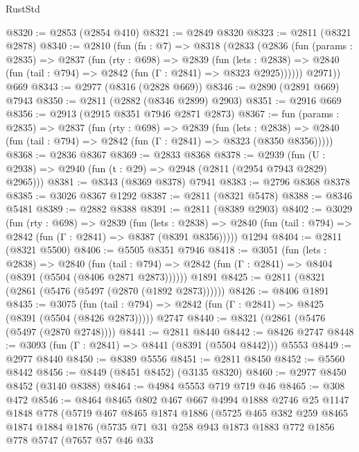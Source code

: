\begin{lexlean}{RustStd}
\begin{coremodule}
{\begin{coremodule}
{{{{{{{{{{{{{{{@8320 := @2853 (@2854 @410)
@8321 := @2849 @8320
@8323 := @2811 (@8321 @2878)
@8340 := @2810
    (fun (fn : @7) =>
    @8318
      (@2833
        (@2836
          (fun (params : @2835) =>
          @2837
            (fun (rty : @698) =>
            @2839
              (fun (lets : @2838) =>
              @2840 (fun (tail : @794) => @2842 (fun (Γ : @2841) => @8323 @2925))))))
        @2971))
    @669
@8343 := @2977 (@8316 (@2828 @669))
@8346 := @2890 (@2891 @669) @7943
@8350 := @2811 (@2882 (@8346 @2899) @2903)
@8351 := @2916 @669
@8356 := @2913 (@2915 @8351 @7946 @2871 @2873)
@8367 := fun (params : @2835) =>
  @2837
    (fun (rty : @698) =>
    @2839
      (fun (lets : @2838) =>
      @2840 (fun (tail : @794) => @2842 (fun (Γ : @2841) => @8323 (@8350 @8356)))))
@8368 := @2836 @8367
@8369 := @2833 @8368
@8378 := @2939 (fun (U : @2938) => @2940 (fun (t : @29) => @2948 (@2811 (@2954 @7943 @2829) @2965)))
@8381 := @8343 (@8369 @8378) @7941
@8383 := @2796 @8368 @8378
@8385 := @3026 @8367 @1292
@8387 := @2811 (@8321 @5478)
@8388 := @8346 @5481
@8389 := @2882 @8388
@8391 := @2811 (@8389 @2903)
@8402 := @3029
    (fun (rty : @698) =>
    @2839
      (fun (lets : @2838) =>
      @2840 (fun (tail : @794) => @2842 (fun (Γ : @2841) => @8387 (@8391 @8356)))))
    @1294
@8404 := @2811 (@8321 @5500)
@8406 := @5505 @8351 @7946
@8418 := @3051
    (fun (lets : @2838) =>
    @2840
      (fun (tail : @794) => @2842 (fun (Γ : @2841) => @8404 (@8391 (@5504 (@8406 @2871 @2873))))))
    @1891
@8425 := @2811 (@8321 (@2861 (@5476 (@5497 (@2870 (@1892 @2873))))))
@8426 := @8406 @1891
@8435 := @3075
    (fun (tail : @794) => @2842 (fun (Γ : @2841) => @8425 (@8391 (@5504 (@8426 @2873)))))
    @2747
@8440 := @8321 (@2861 (@5476 (@5497 (@2870 @2748))))
@8441 := @2811 @8440
@8442 := @8426 @2747
@8448 := @3093 (fun (Γ : @2841) => @8441 (@8391 (@5504 @8442))) @5553
@8449 := @2977 @8440
@8450 := @8389 @5556
@8451 := @2811 @8450
@8452 := @5560 @8442
@8456 := @8449 (@8451 @8452) (@3135 @8320)
@8460 := @2977 @8450 @8452 (@3140 @8388)
@8464 := @4984 @5553 @719 @719 @46
@8465 := @308 @472
@8546 := @8464
    @8465
    @802
    @467
    @667
    @4994
    @1888
    @2746
    @25
    @1147
    @1848
    @778
    (@5719
      @467
      @8465
      @1874
      @1886
      (@5725
        @465
        @382
        @259
        @8465
        @1874
        @1884
        @1876
        (@5735
          @71
          @31
          @258
          @943
          @1873
          @1883
          @772
          @1856
          @778
          @5747
          (@7657
            @57
            @46
            @33
}}}}}}}}}}}}}}}
\end{coremodule}}
\end{coremodule}
\end{lexlean}
